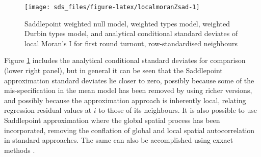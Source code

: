 \documentclass[]{book}
\newenvironment{Shaded}{\begin{snugshade}}{\end{snugshade}}
\newcommand{\CharTok}[1]{\textcolor[rgb]{0.31,0.60,0.02}{#1}}
\newcommand{\DataTypeTok}[1]{\textcolor[rgb]{0.13,0.29,0.53}{#1}}
\newcommand{\DecValTok}[1]{\textcolor[rgb]{0.00,0.00,0.81}{#1}}
\newcommand{\KeywordTok}[1]{\textcolor[rgb]{0.13,0.29,0.53}{\textbf{#1}}}
\newcommand{\NormalTok}[1]{#1}
\newcommand{\OperatorTok}[1]{\textcolor[rgb]{0.81,0.36,0.00}{\textbf{#1}}}
\newcommand{\OtherTok}[1]{\textcolor[rgb]{0.56,0.35,0.01}{#1}}
\newcommand{\StringTok}[1]{\textcolor[rgb]{0.31,0.60,0.02}{#1}}
\begin{document}
\begin{Shaded}
\end{Shaded}

\begin{figure}

{\centering \texttt{[image: sds\_files/figure-latex/localmoranZsad-1]} 

}

\caption{Saddlepoint weighted null model, weighted types model, weighted Durbin types model, and analytical conditional standard deviates of local Moran's I for first round turnout, row-standardised neighbours}\label{fig:localmoranZsad}
\end{figure}

Figure \ref{fig:localmoranZsad} includes the analytical conditional standard deviates for comparison (lower right panel), but in general it can be seen that the Saddlepoint approximation standard deviates lie closer to zero, possibly because some of the mis-specification in the mean model has been removed by using richer versions, and possibly because the approximation approach is inherently local, relating regression residual values at \(i\) to those of its neighbours. It is also possible to use Saddlepoint approximation where the global spatial process has been incorporated, removing the conflation of global and local spatial autocorrelation in standard approaches. The same can also be accomplished using exxact methods \citep{bivandetal:09}.
\end{document}

